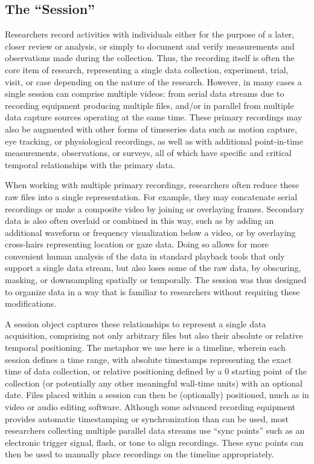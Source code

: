 \documentclass{sig-alternate}
\begin{document}
\subsection{The ``Session''}

Researchers record activities with individuals either for the purpose of a later, closer review or analysis, or simply to document and verify measurements and observations made during the collection.
Thus, the recording itself is often the core item of research, representing a single data collection, experiment, trial, visit, or case depending on the nature of the research.
However, in many cases a single session can comprise multiple videos: from serial data streams due to recording equipment producing multiple files, and/or in parallel from multiple data capture sources operating at the same time.
These primary recordings may also be augmented with other forms of timeseries data such as motion capture, eye tracking, or physiological recordings, as well as with additional point-in-time measurements, observations, or surveys, all of which have specific and critical temporal relationships with the primary data.

When working with multiple primary recordings, researchers often reduce these raw files into a single representation.
For example, they may concatenate serial recordings or make a composite video by joining or overlaying frames.
Secondary data is also often overlaid or combined in this way, such as by adding an additional waveform or frequency visualization below a video, or by overlaying cross-hairs representing location or gaze data.
Doing so allows for more convenient human analysis of the data in standard playback tools that only support a single data stream, but also loses some of the raw data, by obscuring, masking, or downsampling spatially or temporally.
The session was thus designed to organize data in a way that is familiar to researchers without requiring these modifications.

A session object captures these relationships to represent a single data acquisition, comprising not only arbitrary files but also their absolute or relative temporal positioning.
The metaphor we use here is a timeline, wherein each session defines a time range, with absolute timestamps representing the exact time of data collection, or relative positioning defined by a 0 starting point of the collection (or potentially any other meaningful wall-time units) with an optional date.
Files placed within a session can then be (optionally) positioned, much as in video or audio editing software.
Although some advanced recording equipment provides automatic timestamping or synchronization than can be used, most researchers collecting multiple parallel data streams use ``sync points'' such as an electronic trigger signal, flash, or tone to align recordings.
These sync points can then be used to manually place recordings on the timeline appropriately.
\end{document}
